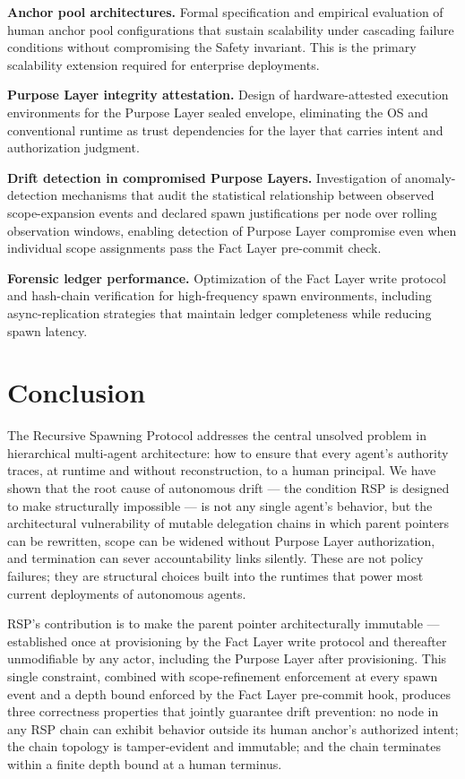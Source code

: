 \textbf{Anchor pool architectures.} Formal specification and empirical evaluation of human anchor pool configurations that sustain scalability under cascading failure conditions without compromising the Safety invariant. This is the primary scalability extension required for enterprise \bxthree{} deployments.

\textbf{Purpose Layer integrity attestation.} Design of hardware-attested execution environments for the Purpose Layer sealed envelope, eliminating the OS and conventional runtime as trust dependencies for the layer that carries intent and authorization judgment.

\textbf{Drift detection in compromised Purpose Layers.} Investigation of anomaly-detection mechanisms that audit the statistical relationship between observed scope-expansion events and declared spawn justifications per node over rolling observation windows, enabling detection of Purpose Layer compromise even when individual scope assignments pass the Fact Layer pre-commit check.

\textbf{Forensic ledger performance.} Optimization of the Fact Layer write protocol and hash-chain verification for high-frequency spawn environments, including async-replication strategies that maintain ledger completeness while reducing spawn latency.

\section{Conclusion}\label{sec:rs-conclusion}

The Recursive Spawning Protocol addresses the central unsolved problem in hierarchical multi-agent architecture: how to ensure that every agent's authority traces, at runtime and without reconstruction, to a human principal. We have shown that the root cause of autonomous drift — the condition RSP is designed to make structurally impossible — is not any single agent's behavior, but the architectural vulnerability of mutable delegation chains in which parent pointers can be rewritten, scope can be widened without Purpose Layer authorization, and termination can sever accountability links silently. These are not policy failures; they are structural choices built into the runtimes that power most current deployments of autonomous agents.

RSP's contribution is to make the parent pointer architecturally immutable — established once at provisioning by the Fact Layer write protocol and thereafter unmodifiable by any actor, including the Purpose Layer after provisioning. This single constraint, combined with scope-refinement enforcement at every spawn event and a depth bound enforced by the Fact Layer pre-commit hook, produces three correctness properties that jointly guarantee drift prevention: no node in any RSP chain can exhibit behavior outside its human anchor's authorized intent; the chain topology is tamper-evident and immutable; and the chain terminates within a finite depth bound at a human terminus.


